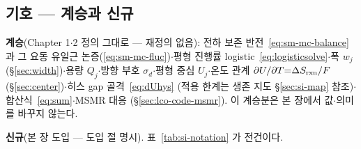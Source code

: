 \subsection*{기호 --- 계승과 신규}
\textbf{계승}(Chapter 1$\cdot$2 정의 그대로 --- 재정의 없음): 전하 보존 반전~\eqref{eq:sm-mc-balance}
과 그 요동 유일근 논증(\eqref{eq:sm-mc-fluc})$\cdot$평형 진행률 logistic~\eqref{eq:logisticsolve}$\cdot$폭
$w_j$(\S\ref{sec:width})$\cdot$용량 $Q_j$$\cdot$방향 부호 $\sigma_d$$\cdot$평형 중심 $U_j$$\cdot$온도 관계
$\partial U/\partial T{=}\Delta S_{\mathrm{rxn}}/F$(\S\ref{sec:center})$\cdot$히스 gap 골격~\eqref{eq:dUhys}
(적용 한계는 생존 지도 \S\ref{sec:si-map} 참조)$\cdot$합산식~\eqref{eq:sum}$\cdot$MSMR 대응
(\S\ref{sec:lco-code-msmr}). 이 계승분은 본 장에서 값$\cdot$의미를 바꾸지 않는다.

\textbf{신규}(본 장 도입 --- 도입 절 명시). 표~\ref{tab:si-notation} 가 전건이다.

